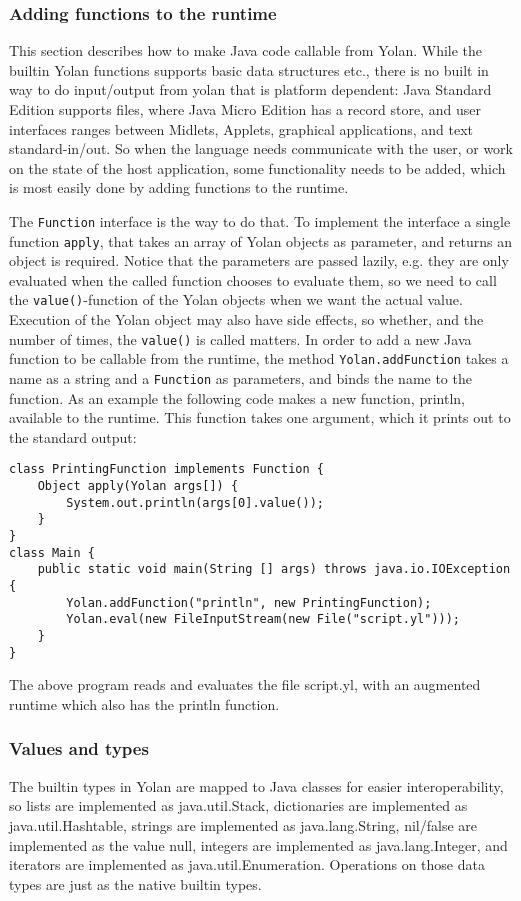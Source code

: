 \documentclass[11pt]{report}
\begin{document}
\subsubsection{Adding functions to the runtime}
This section describes how to make Java code callable from Yolan.
While the builtin Yolan functions supports basic data structures etc., there is no built in way to do input/output from yolan that is platform dependent: Java Standard Edition supports files, where Java Micro Edition has a record store, and user interfaces ranges between Midlets, Applets, graphical applications, and text standard-in/out.
So when the language needs communicate with the user, or work on the state of the host application, 
some functionality needs to be added, which is most easily done by adding functions to the runtime.

The \verb|Function| interface is the way to do that. To implement the interface a single function \verb|apply|, that takes an array of Yolan objects as parameter, and returns an object is required.
Notice that the parameters are passed lazily, e.g. they are only evaluated when the called function chooses to evaluate them, so we need to call the \verb|value()|-function of the Yolan objects when we want the actual value.
Execution of the Yolan object may also have side effects, so whether, and the number of times, the \verb|value()| is called matters.
In order to add a new Java function to be callable from the runtime, the method \verb|Yolan.addFunction| takes a name as a string and a \verb|Function| as parameters, and binds the name to the function. As an example the following code makes a new function, println, available to the runtime. This function takes one argument, which it prints out to the standard output:
\begin{lstlisting}
class PrintingFunction implements Function {
    Object apply(Yolan args[]) {
        System.out.println(args[0].value());
    }
}
class Main {
    public static void main(String [] args) throws java.io.IOException {
        Yolan.addFunction("println", new PrintingFunction);
        Yolan.eval(new FileInputStream(new File("script.yl")));
    }
}
\end{lstlisting} 
The above program reads and evaluates the file script.yl, with an augmented runtime which also has the println function.

\subsubsection{Values and types}
The builtin types in Yolan are mapped to Java classes for easier interoperability,
so lists are implemented as java.util.Stack, dictionaries are implemented as java.util.Hashtable, strings are implemented as java.lang.String, nil/false are implemented as the value null, integers are implemented as java.lang.Integer, and iterators are implemented as java.util.Enumeration. 
Operations on those data types are just as the native builtin types. 
\end{document}
